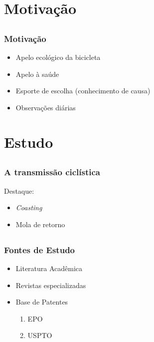 \documentclass{beamer}
\begin{document}
\section{Motivação}

\subsection{}
\begin{frame}
 \frametitle{Motivação}

  \begin{itemize}[<+->]
    \item Apelo ecológico da bicicleta
    \item Apelo à saúde
    \item Esporte de escolha (conhecimento de causa)
    \item Observações diárias
  \end{itemize}

\end{frame}

\section{Estudo}
\subsection{}
\begin{frame}
  \frametitle{A transmissão ciclística}
  Destaque:
  \begin{itemize}
    \item \textit{Coasting}
    \item Mola de retorno
  \end{itemize}
\end{frame}

\subsection{}
\begin{frame}
  \frametitle{Fontes de Estudo}
  \begin{itemize}%
    \item Literatura Acadêmica
    \item Revistas especializadas
    \item Base de Patentes
      \begin{enumerate}
        \item EPO
        \item USPTO
      \end{enumerate}
  \end{itemize}
\end{frame}
\end{document}

